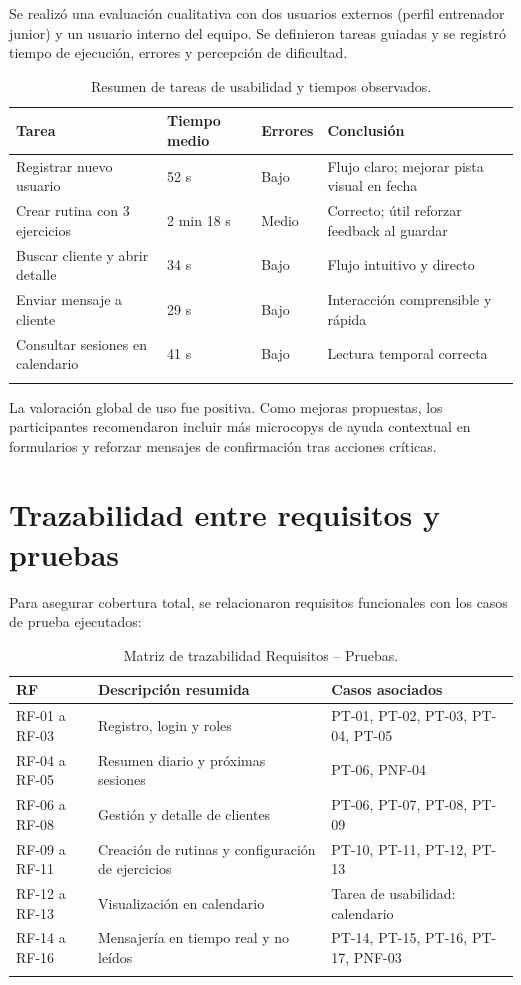 Se realizó una evaluación cualitativa con dos usuarios externos (perfil entrenador junior) y un usuario interno del equipo. Se definieron tareas guiadas y se registró tiempo de ejecución, errores y percepción de dificultad.

\begin{longtable}{@{}p{4.5cm}p{2.5cm}p{2cm}p{4cm}@{}}
\toprule
\textbf{Tarea} & \textbf{Tiempo medio} & \textbf{Errores} & \textbf{Conclusión} \\
\midrule
\endhead
Registrar nuevo usuario & 52 s & Bajo & Flujo claro; mejorar pista visual en fecha \\
Crear rutina con 3 ejercicios & 2 min 18 s & Medio & Correcto; útil reforzar feedback al guardar \\
Buscar cliente y abrir detalle & 34 s & Bajo & Flujo intuitivo y directo \\
Enviar mensaje a cliente & 29 s & Bajo & Interacción comprensible y rápida \\
Consultar sesiones en calendario & 41 s & Bajo & Lectura temporal correcta \\
\bottomrule
\caption{Resumen de tareas de usabilidad y tiempos observados.}
\end{longtable}

La valoración global de uso fue positiva. Como mejoras propuestas, los participantes recomendaron incluir más microcopys de ayuda contextual en formularios y reforzar mensajes de confirmación tras acciones críticas.

\section{Trazabilidad entre requisitos y pruebas}

Para asegurar cobertura total, se relacionaron requisitos funcionales con los casos de prueba ejecutados:

\begin{longtable}{@{}p{2cm}p{8cm}p{4cm}@{}}
\toprule
\textbf{RF} & \textbf{Descripción resumida} & \textbf{Casos asociados} \\
\midrule
\endhead
RF-01 a RF-03 & Registro, login y roles & PT-01, PT-02, PT-03, PT-04, PT-05 \\
RF-04 a RF-05 & Resumen diario y próximas sesiones & PT-06, PNF-04 \\
RF-06 a RF-08 & Gestión y detalle de clientes & PT-06, PT-07, PT-08, PT-09 \\
RF-09 a RF-11 & Creación de rutinas y configuración de ejercicios & PT-10, PT-11, PT-12, PT-13 \\
RF-12 a RF-13 & Visualización en calendario & Tarea de usabilidad: calendario \\
RF-14 a RF-16 & Mensajería en tiempo real y no leídos & PT-14, PT-15, PT-16, PT-17, PNF-03 \\
\bottomrule
\caption{Matriz de trazabilidad Requisitos -- Pruebas.}
\end{longtable}

